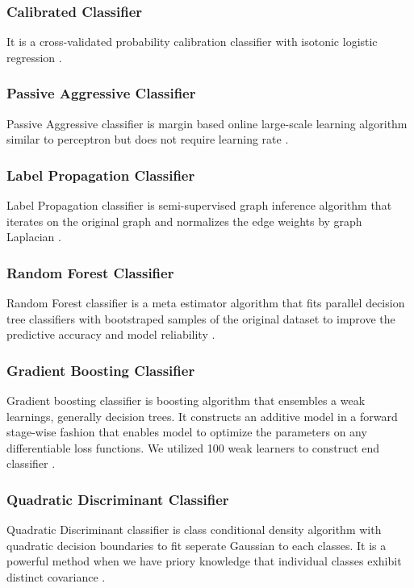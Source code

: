 \documentclass[10pt, twocolumn, letterpaper]{article}
\begin{document}
\subsubsection{Calibrated Classifier}
It is a cross-validated probability calibration classifier with isotonic logistic regression \cite{scikit-learn}.

\subsubsection{Passive Aggressive Classifier}
Passive Aggressive classifier is margin based online large-scale learning algorithm similar to perceptron but does not require learning rate \cite{crammer2006online, scikit-learn}.

\subsubsection{Label Propagation Classifier}
Label Propagation classifier is semi-supervised graph inference algorithm that iterates on the original graph and normalizes the edge weights by graph Laplacian \cite{heckemann2006automatic, scikit-learn}.

\subsubsection{Random Forest Classifier}
Random Forest classifier is a meta estimator algorithm that fits parallel decision tree classifiers with bootstraped samples of the original dataset to improve the predictive accuracy and model reliability \cite{scikit-learn}.

\subsubsection{Gradient Boosting Classifier}
Gradient boosting classifier is boosting algorithm that ensembles a weak learnings, generally decision trees. It constructs an additive model in a forward stage-wise fashion that enables model to optimize the parameters on any differentiable loss functions. We utilized 100 weak learners to construct end classifier \cite{scikit-learn}. 

\subsubsection{Quadratic Discriminant Classifier}
Quadratic Discriminant classifier is class conditional density algorithm with quadratic decision boundaries to fit seperate Gaussian to each classes. It is a powerful method when we have priory knowledge that individual classes exhibit distinct covariance \cite{scikit-learn}.
\end{document}
